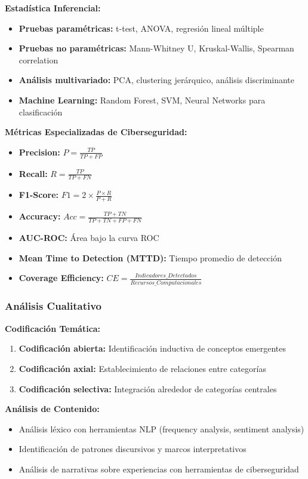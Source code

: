 \textbf{Estadística Inferencial:}
\begin{itemize}
    \item \textbf{Pruebas paramétricas:} t-test, ANOVA, regresión lineal múltiple
    \item \textbf{Pruebas no paramétricas:} Mann-Whitney U, Kruskal-Wallis, Spearman correlation
    \item \textbf{Análisis multivariado:} PCA, clustering jerárquico, análisis discriminante
    \item \textbf{Machine Learning:} Random Forest, SVM, Neural Networks para clasificación
\end{itemize}

\textbf{Métricas Especializadas de Ciberseguridad:}
\begin{itemize}
    \item \textbf{Precision:} $P = \frac{TP}{TP + FP}$
    \item \textbf{Recall:} $R = \frac{TP}{TP + FN}$
    \item \textbf{F1-Score:} $F1 = 2 \times \frac{P \times R}{P + R}$
    \item \textbf{Accuracy:} $Acc = \frac{TP + TN}{TP + TN + FP + FN}$
    \item \textbf{AUC-ROC:} Área bajo la curva ROC
    \item \textbf{Mean Time to Detection (MTTD):} Tiempo promedio de detección
    \item \textbf{Coverage Efficiency:} $CE = \frac{Indicadores\_Detectados}{Recursos\_Computacionales}$
\end{itemize}

\subsubsection{Análisis Cualitativo}

\textbf{Codificación Temática:}
\begin{enumerate}
    \item \textbf{Codificación abierta:} Identificación inductiva de conceptos emergentes
    \item \textbf{Codificación axial:} Establecimiento de relaciones entre categorías
    \item \textbf{Codificación selectiva:} Integración alrededor de categorías centrales
\end{enumerate}

\textbf{Análisis de Contenido:}
\begin{itemize}
    \item Análisis léxico con herramientas NLP (frequency analysis, sentiment analysis)
    \item Identificación de patrones discursivos y marcos interpretativos
    \item Análisis de narrativas sobre experiencias con herramientas de ciberseguridad
\end{itemize}

